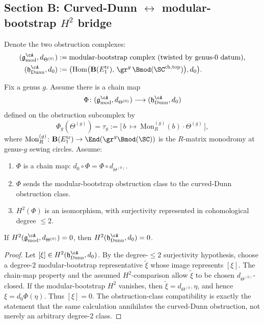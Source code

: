 \subsection{Section B: Curved-Dunn $\leftrightarrow$ modular-bootstrap $H^2$ bridge}
\label{subsec:curved-dunn-bridge}

Denote the two obstruction complexes:
\begin{align*}
 (\mathfrak{g}^{\cA}_{\mathrm{mod}}, d_{\Theta^{(0)}})
 &:= \text{modular-bootstrap complex (twisted by genus-$0$ datum),}
 \\
 (\mathfrak{h}^{\cA}_{\mathrm{Dunn}}, d_0)
 &:= \bigl(\mathrm{Hom}\bigl(\mathbf{B}(E_1^{\mathrm{tr}}),\,
 \gr^g\,\Bmod(\SC^{\mathrm{ch,top}})\bigr), d_0\bigr).
\end{align*}

\begin{theorem}
\label{thm:curved-dunn-bridge}

Fix a genus \(g\). Assume there is a chain map
\[
 \Phi\colon (\mathfrak{g}^{\cA}_{\mathrm{mod}}, d_{\Theta^{(0)}})
 \longrightarrow (\mathfrak{h}^{\cA}_{\mathrm{Dunn}}, d_0)
\]
defined on the obstruction subcomplex by
\[
 \Phi_g(\Theta^{(g)})
 = \tau_g := \bigl[\, b\ \mapsto\ \mathrm{Mon}^{(g)}_R(b) \cdot
 \Theta^{(g)}\,\bigr],
\]
where $\mathrm{Mon}^{(g)}_R\colon \mathbf{B}(E_1^{\mathrm{tr}})
\to \End(\gr^g\Bmod(\SC))$ is the $R$-matrix monodromy at
genus-$g$ sewing circles. Assume:
\begin{enumerate}[label=\textup{(\roman*)}]
\item $\Phi$ is a chain map: $d_0 \circ \Phi = \Phi \circ d_{\Theta^{(0)}}$.
\item $\Phi$ sends the modular-bootstrap obstruction class to the
 curved-Dunn obstruction class.
\item \(H^2(\Phi)\) is an isomorphism, with surjectivity represented
 in cohomological degree \(\le 2\).
\end{enumerate}
If \(H^2(\mathfrak{g}^{\cA}_{\mathrm{mod}},d_{\Theta^{(0)}})=0\),
then \(H^2(\mathfrak{h}^{\cA}_{\mathrm{Dunn}},d_0)=0\).
\end{theorem}

\begin{proof}
Let \([\xi]\in H^2(\mathfrak{h}^{\cA}_{\mathrm{Dunn}},d_0)\).
By the degree-\(\le2\) surjectivity hypothesis, choose a
degree-\(2\) modular-bootstrap representative \(\tilde\xi\) whose
image represents \([\xi]\). The chain-map property and the
assumed \(H^2\)-comparison allow \(\tilde\xi\) to be chosen
\(d_{\Theta^{(0)}}\)-closed. If the modular-bootstrap \(H^2\)
vanishes, then \(\tilde\xi=d_{\Theta^{(0)}}\eta\), and hence
\(\xi=d_0\Phi(\eta)\). Thus \([\xi]=0\). The obstruction-class
compatibility is exactly the statement that the same calculation
annihilates the curved-Dunn obstruction, not merely an arbitrary
degree-\(2\) class.
\end{proof}

